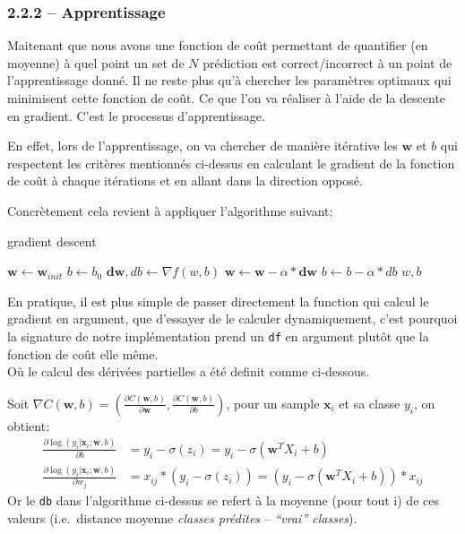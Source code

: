 \documentclass[
]{article}
\begin{document}
\subsubsection{2.2.2 -- Apprentissage}\label{apprentissage}

Maitenant que nous avons une fonction de coût permettant de quantifier
(en moyenne) à quel point un set de \(N\) prédiction est
correct/incorrect à un point de l'apprentissage donné. Il ne reste plus
qu'à chercher les paramètres optimaux qui minimisent cette fonction de
coût. Ce que l'on va réaliser à l'aide de la descente en gradient. C'est
le processus d'apprentissage.

En effet, lors de l'apprentissage, on va chercher de manière itérative
les \(\mathbf{w}\) et \(b\) qui respectent les critères mentionnés
ci-dessus en calculant le gradient de la fonction de coût à chaque
itérations et en allant dans la direction opposé.

Concrètement cela revient à appliquer l'algorithme suivant:

\begin{algorithm}
\caption{gradient descent}\label{alg:grad_desc}
\begin{algorithmic}
\State $\mathbf{w}\gets \mathbf{w}_{init}$
\State $b \gets b_0$
    \State $\mathbf{dw}, db \gets \nabla{f(w, b)} $
    \State $\mathbf{w}\gets \mathbf{w}- \alpha*\mathbf{dw}$
    \State $b \gets b - \alpha*db$
\EndFor
\State \Return $w, b$
\EndFunction
\end{algorithmic}
\end{algorithm}

En pratique, il est plus simple de passer directement la function qui
calcul le gradient en argument, que d'essayer de le calculer
dynamiquement, c'est pourquoi la signature de notre implémentation prend
un \texttt{df} en argument plutôt que la fonction de coût elle même.\\
Où le calcul des dérivées partielles a été definit comme ci-dessous.

Soit
\(\nabla C(\mathbf{w},b) = (\frac{\partial C(\mathbf{w},b)}{\partial \mathbf{w}}, \frac{\partial C(\mathbf{w},b)}{\partial b} )\),
pour un sample \(\mathbf{x}_i\) et sa classe \(y_i\), on obtient:
\begin{align*}
\frac{\partial \log(y_i|\mathbf{x}_i ; \mathbf{w}, b)}{\partial b} 
&= y_i - \sigma(z_i) 
= y_i - \sigma(\mathbf{w}^T X_i + b)\\
%
\frac{\partial \log(y_i|\mathbf{x}_i ; \mathbf{w}, b)}{\partial w_j} 
&= x_{ij}* ( y_i - \sigma(z_i)) 
= (y_i - \sigma(\mathbf{w}^T X_i + b)) * x_{ij}
\end{align*} Or le \texttt{db} dans l'algorithme ci-dessus se refert à
la moyenne (pour tout i) de ces valeurs (i.e.~distance moyenne
\emph{classes prédites} -- \emph{``vrai'' classes}).
\end{document}
